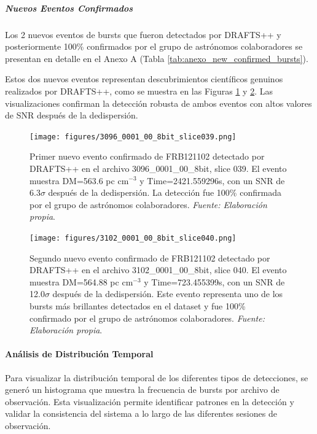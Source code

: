 \subparagraph{Nuevos Eventos Confirmados}

Los 2 nuevos eventos de bursts que fueron detectados por DRAFTS++ y posteriormente 100\% confirmados por el grupo de astrónomos colaboradores se presentan en detalle en el Anexo A (Tabla \ref{tab:anexo_new_confirmed_bursts}).

Estos dos nuevos eventos representan descubrimientos científicos genuinos realizados por DRAFTS++, como se muestra en las Figuras \ref{fig:new_event_3096} y \ref{fig:new_event_3102}. Las visualizaciones confirman la detección robusta de ambos eventos con altos valores de SNR después de la dedispersión.

\begin{figure}[H]
    \centering
    \texttt{[image: figures/3096\_0001\_00\_8bit\_slice039.png]}
    \caption[FRB121102: nuevo evento confirmado (3096\_...\_slice039)]{Primer nuevo evento confirmado de FRB121102 detectado por DRAFTS++ en el archivo 3096\_0001\_00\_8bit, slice 039. El evento muestra DM=563.6 pc cm$^{-3}$ y Time=2421.559296s, con un SNR de 6.3$\sigma$ después de la dedispersión. La detección fue 100\% confirmada por el grupo de astrónomos colaboradores. \textit{Fuente: Elaboración propia}.}
    \label{fig:new_event_3096}
\end{figure}

\begin{figure}[H]
    \centering
    \texttt{[image: figures/3102\_0001\_00\_8bit\_slice040.png]}
    \caption[FRB121102: nuevo evento confirmado (3102\_...\_slice040)]{Segundo nuevo evento confirmado de FRB121102 detectado por DRAFTS++ en el archivo 3102\_0001\_00\_8bit, slice 040. El evento muestra DM=564.88 pc cm$^{-3}$ y Time=723.455399s, con un SNR de 12.0$\sigma$ después de la dedispersión. Este evento representa uno de los bursts más brillantes detectados en el dataset y fue 100\% confirmado por el grupo de astrónomos colaboradores. \textit{Fuente: Elaboración propia}.}
    \label{fig:new_event_3102}
\end{figure}

\paragraph{Análisis de Distribución Temporal}

Para visualizar la distribución temporal de los diferentes tipos de detecciones, se generó un histograma que muestra la frecuencia de bursts por archivo de observación. Esta visualización permite identificar patrones en la detección y validar la consistencia del sistema a lo largo de las diferentes sesiones de observación.

